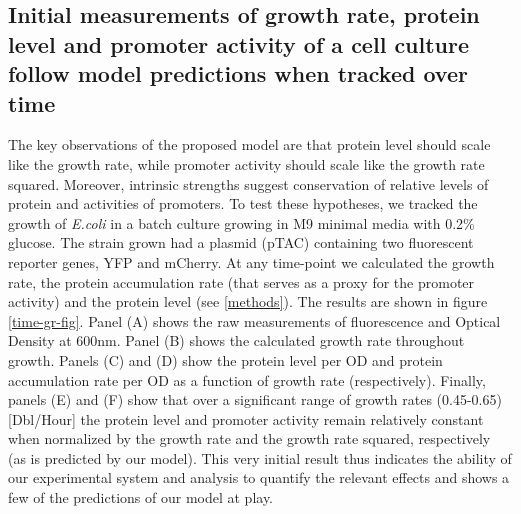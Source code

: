 \documentclass[a4page,notitlepage]{article}
\begin{document}
\subsection{Initial measurements of growth rate, protein level and promoter activity of a cell culture follow model predictions when tracked over time}
The key observations of the proposed model are that protein level should scale like the growth rate, while promoter activity should scale like the growth rate squared.
Moreover, intrinsic strengths suggest conservation of relative levels of protein and activities of promoters.
To test these hypotheses, we tracked the growth of \emph{E.coli} in a batch culture growing in M9 minimal media with 0.2\% glucose.
The strain grown had a plasmid (pTAC) containing two fluorescent reporter genes, YFP and mCherry.
At any time-point we calculated the growth rate, the protein accumulation rate (that serves as a proxy for the promoter activity) and the protein level (see \ref{methods}).
The results are shown in figure \ref{time-gr-fig}.
Panel (A) shows the raw measurements of fluorescence and Optical Density at 600nm.
Panel (B) shows the calculated growth rate throughout growth.
Panels (C) and (D) show the protein level per OD and protein accumulation rate per OD as a function of growth rate (respectively).
Finally, panels (E) and (F) show that over a significant range of growth rates (0.45-0.65)[Dbl/Hour] the protein level and promoter activity remain relatively constant when normalized by the growth rate and the growth rate squared, respectively (as is predicted by our model).
This very initial result thus indicates the ability of our experimental system and analysis to quantify the relevant effects and shows a few of the predictions of our model at play.
\end{document}
